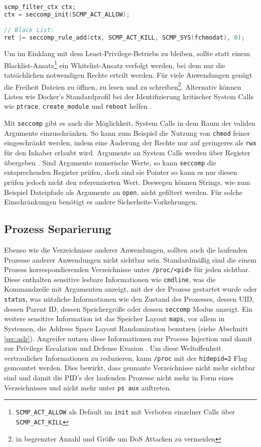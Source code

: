 \begin{lstlisting}[language=c]
scmp_filter_ctx ctx;
ctx = seccomp_init(SCMP_ACT_ALLOW);

// Black List:
ret |= seccomp_rule_add(ctx, SCMP_ACT_KILL, SCMP_SYS(fchmodat), 0); 
\end{lstlisting}

Um im Einklang mit dem Least-Privilege-Betriebs zu bleiben, sollte statt einem Blacklist-Ansatz\footnote{\texttt{SCMP\_ACT\_ALLOW} als Default im \texttt{init} mit Verboten einzelner Calls über \texttt{SCMP\_ACT\_KILL}} ein Whitelist-Ansatz verfolgt werden, bei dem nur die tatsächlichen notwendigen Rechte erteilt werden. Für viele Anwendungen genügt die Freiheit Dateien zu öffnen, zu lesen und zu schreiben\footnote{in begrenzter Anzahl und Größe um DoS Attacken zu vermeiden}.
Alternativ können Listen wie Docker's Standardprofil bei der Identifizierung kritischer System Calls wie \texttt{ptrace}, \texttt{create\_module} und \texttt{reboot} helfen \cite{docker-seccomp}. 

Mit \texttt{seccomp} gibt es auch die Möglichkeit, System Calls in dem Raum der validen Argumente einzuschränken. So kann zum Beispiel die Nutzung von \texttt{chmod} feiner eingeschränkt werden, indem eine Änderung der Rechte nur auf geringeres als \texttt{rwx} für den Inhaber erlaubt wird. Argumente an System Calls werden über Register übergeben \cite{man-syscall}. Sind Argumente numerische Werte, so kann \texttt{seccomp} die entsprechenden Register prüfen,
doch sind sie Pointer so kann es nur diesen prüfen jedoch nicht den referenzierten Wert. Deswegen können Strings, wie zum Beispiel Dateipfade als Argumente an \texttt{open}, nicht gefiltert werden. Für solche Einschränkungen benötigt es andere Sicherheits-Vorkehrungen.

\subsection{Prozess Separierung}

Ebenso wie die Verzeichnisse anderer Anwendungen, sollten auch die laufenden Prozesse anderer Anwendungen nicht sichtbar sein. Standardmäßig sind die einem Prozess korrespondierenden Verzeichnisse unter \texttt{/proc/<pid>} für jeden sichtbar. Diese enthalten sensitive lesbare Informationen wie \texttt{cmdline}, was die Kommandzeile mit Argumenten anzeigt, mit der der Prozess gestartet wurde oder \texttt{status}, was nützliche Informationen wie den Zustand des Prozesses, dessen
UID, dessen Parent ID, dessen Speichergröße oder dessen \texttt{seccomp} Modus anzeigt. Ein weitere sensitive Information ist das Speicher Layout \texttt{maps}, vor allem in Systemen, die Address Space Layout Randomization benutzen (siehe Abschnitt \ref{sec:aslr}).
Angreifer nutzen diese Informationen zur Process Injection und damit zur Privilege Escalation und Defense Evasion \cite{attack-process-injection}.
Um diese Weltoffenheit vertraulicher Informationen zu reduzieren, kann \texttt{/proc} mit der \texttt{hidepid=2} Flag gemountet werden. Dies bewirkt, dass gennante Verzeichnisse nicht mehr sichtbar sind und damit die PID's der laufenden Prozesse nicht mehr in Form eines Verzeichnisses und nicht mehr unter \texttt{ps aux} auftreten. 

